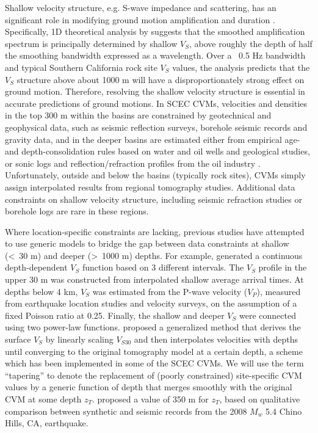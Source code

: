 Shallow velocity structure, e.g. S-wave impedance and scattering, has an significant role in modifying ground motion amplification and duration . Specifically, 1D theoretical analysis by \citet{dayRMSResponseOnedimensional1996} suggests that the smoothed amplification spectrum is principally determined by shallow $V_S$, above roughly the depth of half the smoothing bandwidth expressed as a wavelength. Over a ~0.5 Hz bandwidth and typical Southern California rock site $V_S$ values, the analysis predicts that the $V_S$ structure above about 1000 m will have a disproportionately strong effect on ground motion. Therefore, resolving the shallow velocity structure is essential in accurate predictions of ground motions. In SCEC CVMs, velocities and densities in the top 300 m within the basins are constrained by geotechnical and geophysical data, such as seismic reflection surveys, borehole seismic records and gravity data, and in the deeper basins are estimated either from empirical age- and depth-consolidation rules based on water and oil wells and geological studies, or sonic logs and reflection/refraction profiles from the oil industry \citep{magistraleGeologybased3DVelocity1996,magistraleSCECSouthernCalifornia2000,sussWaveSeismicVelocity2003}. Unfortunately, outside and below the basins (typically rock sites), CVMs simply assign interpolated results from regional tomography studies. Additional data constraints on shallow velocity structure, including seismic refraction studies  or borehole logs  are rare in these regions.

Where location-specific constraints are lacking, previous studies have attempted to use generic models to bridge the gap between data constraints at shallow (<~30 m) and deeper (>~1000 m) depths. For example, \citet{booreSiteAmplificationsGeneric1997} generated a continuous depth-dependent $V_S$ function based on 3 different intervals. The $V_S$ profile in the upper 30 m was constructed from interpolated shallow average arrival times. At depths below 4 km, $V_S$ was estimated from the P-wave velocity ($V_P$), measured from earthquake location studies and velocity surveys, on the assumption of a fixed Poisson ratio at 0.25. Finally, the shallow and deeper $V_S$ were connected using two power-law functions. \citet{elyVs30derivedNearsurfaceSeismic2010} proposed a generalized method that derives the surface $V_S$ by linearly scaling $V_{S30}$ and then interpolates velocities with depths until converging to the original tomography model at a certain depth, a scheme which has been implemented in some of the SCEC CVMs. We will use the term ``tapering'' to denote the replacement of (poorly constrained) site-specific CVM values by a generic function of depth that merges smoothly with the original CVM at some depth $z_T$. \citet{elyVs30derivedNearsurfaceSeismic2010} proposed a value of 350 m for $z_T$, based on qualitative comparison between synthetic and seismic records from the 2008 $M_w$ 5.4 Chino Hills, CA, earthquake.


